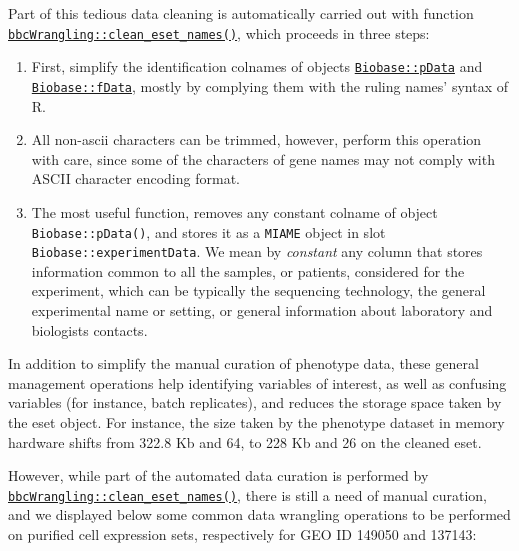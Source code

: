 Part of this tedious data cleaning is automatically carried out with function \href{https://rdrr.io/pkg/bbcWrangling/man/clean_eset_names.html}{\texttt{bbcWrangling::clean\_eset\_names()}}, which proceeds in three steps:

\begin{enumerate}
\def\labelenumi{\arabic{enumi}.}
\item
  First, simplify the identification colnames of objects \href{https://rdrr.io/pkg/Biobase/man/phenoData.html}{\texttt{Biobase::pData}} and \href{https://rdrr.io/pkg/Biobase/man/featureData.html}{\texttt{Biobase::fData}}, mostly by complying them with the ruling names' syntax of R.
\item
  All non-ascii characters can be trimmed, however, perform this operation with care, since some of the characters of gene names may not comply with ASCII character encoding format.
\item
  The most useful function, removes any constant colname of object \texttt{Biobase::pData()}, and stores it as a \texttt{MIAME} object in slot \texttt{Biobase::experimentData}. We mean by \emph{constant} any column that stores information common to all the samples, or patients, considered for the experiment, which can be typically the sequencing technology, the general experimental name or setting, or general information about laboratory and biologists contacts.
\end{enumerate}

In addition to simplify the manual curation of phenotype data, these general management operations help identifying variables of interest, as well as confusing variables (for instance, batch replicates), and reduces the storage space taken by the eset object. For instance, the size taken by the phenotype dataset in memory hardware shifts from 322.8 Kb and 64, to 228 Kb and 26 on the cleaned eset.

However, while part of the automated data curation is performed by \href{https://rdrr.io/pkg/bbcWrangling/man/clean_eset_names.html}{\texttt{bbcWrangling::clean\_eset\_names()}}, there is still a need of manual curation, and we displayed below some common data wrangling operations to be performed on purified cell expression sets, respectively for GEO ID 149050 and 137143:

